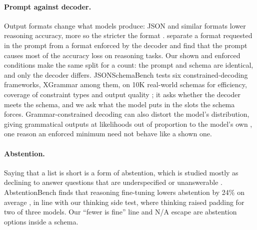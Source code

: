 \paragraph{Prompt against decoder.}
Output formats change what models produce: JSON and similar formats lower reasoning accuracy, more so the stricter the format \citep{tam2024speak}.
\citet{lee2026format} separate a format requested in the prompt from a format enforced by the decoder and find that the prompt causes most of the accuracy loss on reasoning tasks.
Our shown and enforced conditions make the same split for a count: the prompt and schema are identical, and only the decoder differs.
JSONSchemaBench tests six constrained-decoding frameworks, XGrammar among them, on 10K real-world schemas for efficiency, coverage of constraint types and output quality \citep{geng2025jsonschemabench}; it asks whether the decoder meets the schema, and we ask what the model puts in the slots the schema forces.
Grammar-constrained decoding can also distort the model's distribution, giving grammatical outputs at likelihoods out of proportion to the model's own \citep{park2026grammar}, one reason an enforced minimum need not behave like a shown one.

\paragraph{Abstention.}
Saying that a list is short is a form of abstention, which is studied mostly as declining to answer questions that are underspecified or unanswerable \citep{wen2025know}.
AbstentionBench finds that reasoning fine-tuning lowers abstention by 24\% on average \citep{kirichenko2025abstentionbench}, in line with our thinking side test, where thinking raised padding for two of three models.
Our ``fewer is fine'' line and N/A escape are abstention options inside a schema.
